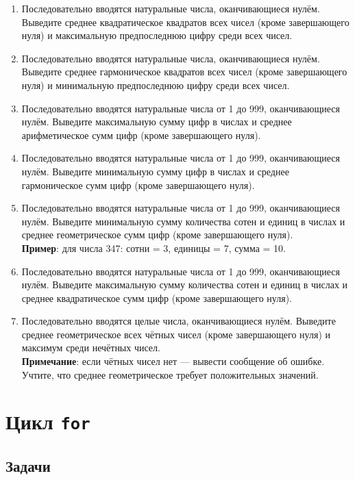 \documentclass[12pt]{article}
\begin{document}
\begin{enumerate}
    \item Последовательно вводятся натуральные числа, оканчивающиеся нулём. Выведите среднее квадратическое квадратов всех чисел (кроме завершающего нуля) и максимальную предпоследнюю цифру среди всех чисел.

    \item Последовательно вводятся натуральные числа, оканчивающиеся нулём. Выведите среднее гармоническое квадратов всех чисел (кроме завершающего нуля) и минимальную предпоследнюю цифру среди всех чисел.

    \item Последовательно вводятся натуральные числа от 1 до 999, оканчивающиеся нулём. Выведите максимальную сумму цифр в числах и среднее арифметическое сумм цифр (кроме завершающего нуля).

    \item Последовательно вводятся натуральные числа от 1 до 999, оканчивающиеся нулём. Выведите минимальную сумму цифр в числах и среднее гармоническое сумм цифр (кроме завершающего нуля).

    \item Последовательно вводятся натуральные числа от 1 до 999, оканчивающиеся нулём. Выведите минимальную сумму количества сотен и единиц в числах и среднее геометрическое сумм цифр (кроме завершающего нуля). \\
    \textbf{Пример}: для числа 347: сотни = 3, единицы = 7, сумма = 10.

    \item Последовательно вводятся натуральные числа от 1 до 999, оканчивающиеся нулём. Выведите максимальную сумму количества сотен и единиц в числах и среднее квадратическое сумм цифр (кроме завершающего нуля).

    \item Последовательно вводятся целые числа, оканчивающиеся нулём. Выведите среднее геометрическое всех чётных чисел (кроме завершающего нуля) и максимум среди нечётных чисел. \\
    \textbf{Примечание}: если чётных чисел нет — вывести сообщение об ошибке. Учтите, что среднее геометрическое требует положительных значений.
\end{enumerate}

\section{Цикл \texttt{for}}

\subsection*{Задачи}
\end{document}
